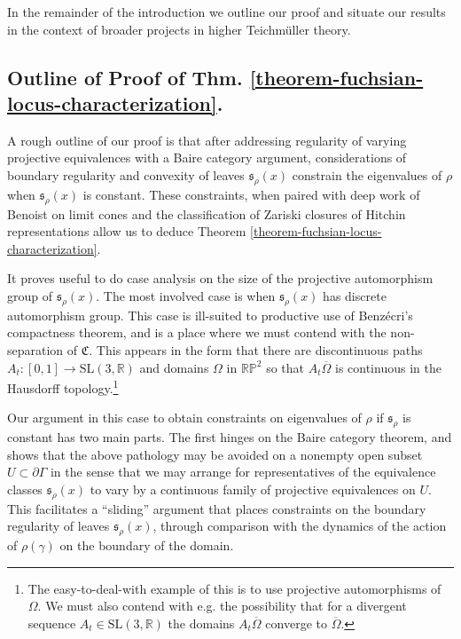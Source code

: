 \documentclass[12pt,a4paper]{amsart}
\newcommand{\bbR}{\mathbb R}
\theoremstyle{definition}
\theoremstyle{plain}
\numberwithin{equation}{section}
\begin{document}
In the remainder of the introduction we outline our proof and situate our results in the context of broader projects in higher Teichm\"uller theory.

\subsection{Outline of Proof of Thm. \ref{theorem-fuchsian-locus-characterization}.}  A rough outline of our proof is that after addressing regularity of varying projective equivalences with a Baire category argument, considerations of boundary regularity and convexity of leaves $\mathfrak{s}_\rho(x)$ constrain the eigenvalues of $\rho$ when $\mathfrak{s}_\rho(x)$ is constant. These constraints, when paired with deep work of Benoist on limit cones \cite{benoist1997proprietes} and the classification of Zariski closures of Hitchin representations \cite{sambarino2020infinitesimal} allow us to deduce Theorem \ref{theorem-fuchsian-locus-characterization}.

It proves useful to do case analysis on the size of the projective automorphism group of $\mathfrak{s}_\rho(x)$. The most involved case is when $\mathfrak{s}_\rho(x)$ has discrete automorphism group. This case is ill-suited to productive use of Benz\'ecri's compactness theorem, and is a place where we must contend with the non-separation of $\mathfrak{C}$. This appears in the form that there are discontinuous paths $A_t : [0,1] \to \text{SL}(3,\bbR)$ and domains $\Omega$ in $\mathbb{RP}^2$ so that $A_t \overline{ \Omega}$ is continuous in the Hausdorff topology.\footnote{The easy-to-deal-with example of this is to use projective automorphisms of $\Omega$. We must also contend with e.g. the possibility that for a divergent sequence $A_t \in \text{SL}(3,\bbR)$ the domains $A_t \overline{\Omega}$ converge to $\overline{\Omega}$.}

Our argument in this case to obtain constraints on eigenvalues of $\rho$ if $\mathfrak{s}_\rho$ is constant has two main parts. The first hinges on the Baire category theorem, and shows that the above pathology may be avoided on a nonempty open subset $U \subset \partial \Gamma$ in the sense that we may arrange for representatives of the equivalence classes $\mathfrak{s}_\rho(x)$ to vary by a continuous family of projective equivalences on $U$. This facilitates a ``sliding'' argument that places constraints on the boundary regularity of leaves $\mathfrak{s}_\rho(x)$, through comparison with the dynamics of the action of $\rho(\gamma)$ on the boundary of the domain.
\end{document}
